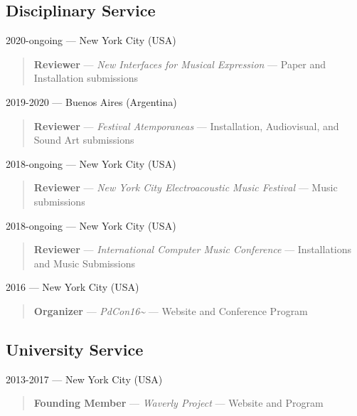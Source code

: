 \documentclass[12pt,overlapped]{res}%
\begin{document}
\begin{resume}
\subsection{Disciplinary Service}%
2020-ongoing --- New York City (USA)%
\begin{quote}
\textbf{Reviewer} --- \textit{New Interfaces for Musical Expression} --- Paper and Installation submissions
\end{quote}%
%
%
%
2019-2020 --- Buenos Aires (Argentina)%
\begin{quote}
\textbf{Reviewer} --- \textit{Festival Atemporaneas} --- Installation, Audiovisual, and Sound Art submissions
\end{quote}%
%
%
%
2018-ongoing --- New York City (USA)%
\begin{quote}
\textbf{Reviewer} --- \textit{New York City Electroacoustic Music Festival} --- Music submissions
\end{quote}%
%
%
%
2018-ongoing --- New York City (USA)%
\begin{quote}
\textbf{Reviewer} --- \textit{International Computer Music Conference} --- Installations and Music Submissions
\end{quote}%
%
%
%
2016 --- New York City (USA)%
\begin{quote}
\textbf{Organizer} --- \textit{PdCon16\textasciitilde{}} --- Website and Conference Program
\end{quote}%
%
%
%
\subsection{University Service}%
2013-2017 --- New York City (USA)%
\begin{quote}
\textbf{Founding Member} --- \textit{Waverly Project} --- Website and Program
\end{quote}%
\end{resume}
\end{document}
